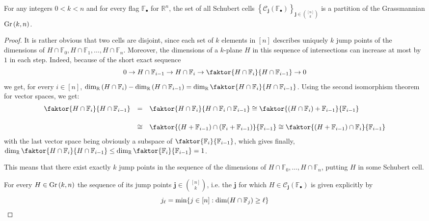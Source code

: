 \begin{lemma}\label{lem:jump_pts} For any integers $0<k<n$ and for every flag $\mathbb{F}_{\bullet}$ for $\mathbb{R}^n$, the set of all Schubert cells ${\left\{\mathcal{C}_{\mathbf{j}}(\mathbb{F}_{\bullet})\right\}}_{\mathbf{j}\in\binom{[n]}{k}}$ is a partition of the Grassmannian $\Gr{k}{n}$.
\end{lemma}
\begin{proof} It is rather obvious that two cells are disjoint, since each set of $k$ elements in $[n]$ describes uniquely $k$ jump points of the dimensions of $H\cap\mathbb{F}_0,H\cap\mathbb{F}_1,\ldots,H\cap\mathbb{F}_n$. Moreover, the dimensions of a $k$-plane $H$ in this sequence of intersections can increase at most by $1$ in each step. Indeed, because of the short exact sequence
\[0\to H\cap\mathbb{F}_{i-1}\to H\cap\mathbb{F}_i\to\faktor{H\cap\mathbb{F}_i}{H\cap\mathbb{F}_{i-1}}\to0\]
we get, for every $i\in[n]$,
$\dim_{\mathbb{R}}\left(H\cap\mathbb{F}_i\right)-\dim_{\mathbb{R}}\left(H\cap\mathbb{F}_{i-1}\right)=\dim_{\mathbb{R}}\faktor{H\cap\mathbb{F}_i}{H\cap\mathbb{F}_{i-1}}$.
Using the second isomorphism theorem for vector spaces, we get:
\[\begin{array}{>{\displaystyle}r>{\displaystyle}c>{\displaystyle}l}\faktor{H\cap\mathbb{F}_i}{H\cap\mathbb{F}_{i-1}}
&=&\faktor{H\cap\mathbb{F}_i}{H\cap\mathbb{F}_i\cap\mathbb{F}_{i-1}}\cong\faktor{(H\cap\mathbb{F}_i)+\mathbb{F}_{i-1}}{\mathbb{F}_{i-1}}\\[1.5em]
&\cong&\faktor{(H+\mathbb{F}_{i-1})\cap(\mathbb{F}_i+\mathbb{F}_{i-1})}{\mathbb{F}_{i-1}}\cong\faktor{(H+\mathbb{F}_{i-1})\cap\mathbb{F}_i}{\mathbb{F}_{i-1}}\\
\end{array}\]
with the last vector space being obviously a subspace of $\faktor{\mathbb{F}_i}{\mathbb{F}_{i-1}}$, which gives finally,
$\dim_{\mathbb{R}}\faktor{H\cap\mathbb{F}_i}{H\cap\mathbb{F}_{i-1}}\leq\dim_{\mathbb{R}}\faktor{\mathbb{F}_i}{\mathbb{F}_{i-1}}=1$.

This means that there exist exactly $k$ jump points in the sequence of the dimensions of $H\cap\mathbb{F}_0,\ldots,H\cap\mathbb{F}_n$, putting $H$ in some Schubert cell.

For every $H\in\Gr{k}{n}$ the sequence of its jump points $\mathbf{j}\in\binom{[n]}{k}$, i.e. the $\mathbf{j}$ for which $H\in\mathcal{C}_{\mathbf{j}}(\mathbb{F}_{\bullet})$ is given explicitly by
\[j_{\ell}=\min\{j\in[n]:\dim(H\cap\mathbb{F}_j)\geq\ell\}\qedhere\]
\end{proof}

